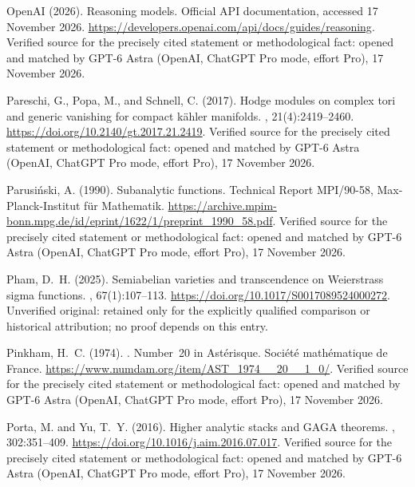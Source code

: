 \begin{thebibliography}{}
{OpenAI} (2026).
\newblock Reasoning models.
\newblock Official API documentation, accessed 17 November 2026.
\newblock \url{https://developers.openai.com/api/docs/guides/reasoning}. Verified source for the precisely cited statement or methodological fact: opened and matched by GPT-6 Astra (OpenAI, ChatGPT Pro mode, effort Pro), 17 November 2026.

Pareschi, G., Popa, M., and Schnell, C. (2017).
\newblock Hodge modules on complex tori and generic vanishing for compact
  k{\"a}hler manifolds.
, 21(4):2419--2460.
\newblock \url{https://doi.org/10.2140/gt.2017.21.2419}. Verified source for the precisely cited statement or methodological fact: opened and matched by GPT-6 Astra (OpenAI, ChatGPT Pro mode, effort Pro), 17 November 2026.

Parusi{\'n}ski, A. (1990).
\newblock Subanalytic functions.
\newblock Technical Report MPI/90-58, Max-Planck-Institut f{\"u}r Mathematik.
\newblock \url{https://archive.mpim-bonn.mpg.de/id/eprint/1622/1/preprint_1990_58.pdf}. Verified source for the precisely cited statement or methodological fact: opened and matched by GPT-6 Astra (OpenAI, ChatGPT Pro mode, effort Pro), 17 November 2026.

Pham, D.~H. (2025).
\newblock Semiabelian varieties and transcendence on {Weierstrass} sigma
  functions.
, 67(1):107--113.
\newblock \url{https://doi.org/10.1017/S0017089524000272}. Unverified original: retained only for the explicitly qualified comparison or historical attribution; no proof depends on this entry.

Pinkham, H.~C. (1974).
.
\newblock Number~20 in Ast\'erisque. Soci\'et\'e math\'ematique de France.
\newblock \url{https://www.numdam.org/item/AST_1974__20__1_0/}. Verified source for the precisely cited statement or methodological fact: opened and matched by GPT-6 Astra (OpenAI, ChatGPT Pro mode, effort Pro), 17 November 2026.

Porta, M. and Yu, T.~Y. (2016).
\newblock Higher analytic stacks and {GAGA} theorems.
, 302:351--409.
\newblock \url{https://doi.org/10.1016/j.aim.2016.07.017}. Verified source for the precisely cited statement or methodological fact: opened and matched by GPT-6 Astra (OpenAI, ChatGPT Pro mode, effort Pro), 17 November 2026.


\end{thebibliography}
